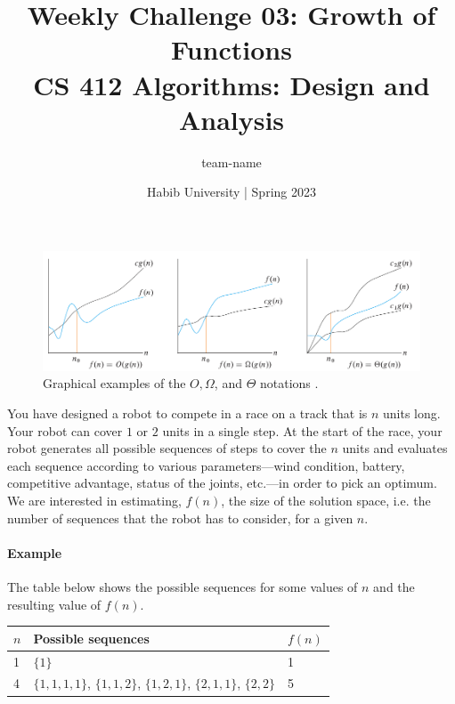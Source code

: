 \documentclass[a4paper]{exam}
\title{Weekly Challenge 03: Growth of Functions\\CS 412 Algorithms: Design and Analysis}
\author{team-name}  %
\date{Habib University | Spring 2023}
\begin{document}
\maketitle

\begin{questions}
  
  
  \begin{figure}[!h]
    \centering
    \includegraphics[width=.95\textwidth]{asymptotic}
    
    \caption{Graphical examples of the $O, \Omega$, and $\Theta$ notations \cite{clrs}.}
    \label{fig:notation}
  \end{figure}
  
  You have designed a robot to compete in a race on a track that is $n$ units long. Your robot can cover $1$ or $2$ units in a single step. At the start of the race, your robot generates all possible sequences of steps to cover the $n$ units and evaluates each sequence according to various parameters---wind condition, battery, competitive advantage, status of the joints, etc.---in order to pick an optimum. We are interested in estimating, $f(n)$, the size of the solution space, i.e. the number of sequences that the robot has to consider, for a given $n$.
  
  \paragraph{Example} The table below shows the possible sequences for some values of $n$ and the resulting value of $f(n)$.
  
  \begin{tabular}{|l|l|l|}
    \hline
    $n$ & Possible sequences& $f(n)$ \\
    \hline\hline
    1 & $\{1\}$ & 1 \\
    4 & $\{1,1,1,1\}$, $\{1,1,2\}$, $\{1,2,1\}$, $\{2,1,1\}$, $\{2,2\}$ & 5 \\
    \hline
  \end{tabular}
  

\end{questions}
\end{document}
